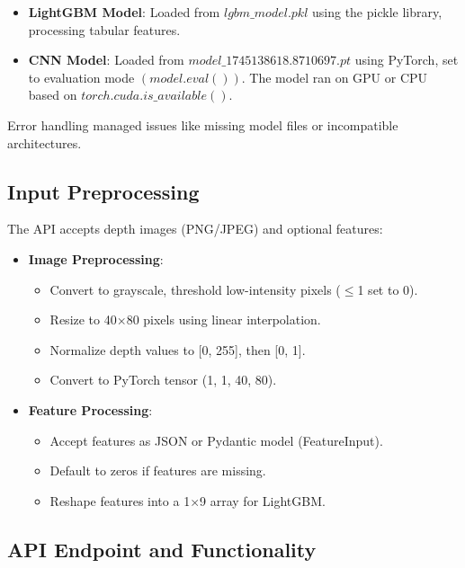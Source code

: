 {\begin{itemize}
	\item \textbf{LightGBM Model}: Loaded from $lgbm\_model.pkl$ using the pickle library, processing tabular features.
	\item \textbf{CNN Model}: Loaded from $model\_1745138618.8710697.pt$ using PyTorch, set to evaluation mode $(model.eval())$. The model ran on GPU or CPU based on $torch.cuda.is\_available()$.
\end{itemize}

Error handling managed issues like missing model files or incompatible architectures.

\subsection{Input Preprocessing}

The API accepts depth images (PNG/JPEG) and optional features:

\begin{itemize}
	\item \textbf{Image Preprocessing}:
	\begin{itemize}
		\item Convert to grayscale, threshold low-intensity pixels ($\leq$1 set to 0).
		\item Resize to 40$\times$80 pixels using linear interpolation.
		\item Normalize depth values to [0, 255], then [0, 1].
		\item Convert to PyTorch tensor (1, 1, 40, 80).
	\end{itemize}
	\item \textbf{Feature Processing}:
	\begin{itemize}
		\item Accept features as JSON or Pydantic model (FeatureInput).
		\item Default to zeros if features are missing.
		\item Reshape features into a 1$\times$9 array for LightGBM.	
	\end{itemize}
\end{itemize}

\subsection{API Endpoint and Functionality}

}
